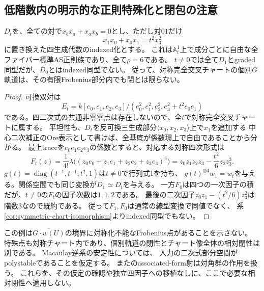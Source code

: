 \subsection{低階数内の明示的な正則特殊化と閉包の注意}
\begin{proposition}[対称型の個別indexed軌道は閉とは限らない]\label{prop:symmetric-regular-specialization}
$D_t$を、全ての対で$x_bx_a+x_ax_b=0$とし、ただし対$01$だけ
\[
 x_1x_0+x_0x_1=t^2x_3^2
\]
に置き換えた四生成代数のindexed化とする。
これは$\mathbb A^1_t$上で成分ごとに自由な全ファイバー標準AS正則族であり、全て$\rho=6$である。
$t\ne0$では全て$D_1$とgraded同型だが、$D_0$とはindexed同型でない。
従って、対称完全交叉チャートの個別$G$軌道は、その有限Frobenius部分内でも閉とは限らない。
\end{proposition}
\begin{proof}
可換双対は
\[
 E_t=k[e_0,e_1,e_2,e_3]/(e_0^2,e_1^2,e_2^2,e_3^2+t^2e_0e_1)
\]
である。四二次式の共通非零零点は存在しないので、全$t$で対称完全交叉チャートに属する。
平坦性も、$D_t$を反可換三生成部分$\langle x_0,x_2,x_3\rangle$上で$x_1$を追加する
中心二次補正のOre表示として書けば、全基底が係数環上で自由であることから分かる。
最上traceを$e_0e_1e_2e_3$の係数とすると、対応する対称四次形式は
\[
 F_t(z)=\frac1{4!}\lambda\bigl((z_0e_0+z_1e_1+z_2e_2+z_3e_3)^4\bigr)
 =z_0z_1z_2z_3-\frac{t^2}{6}z_2z_3^3.
\]
$g(t)=\operatorname{diag}(t^{-1},t^{-1},t^2,1)$は$t\ne0$で行列式1を持ち、
$g(t)^{\otimes4}w_1=w_t$を与える。関係空間でも同じ変換が$D_1\simeq D_t$を与える。
一方$F_0$は四つの一次因子の積だが、$t\ne0$の$F_t$の因子次数は$1,1,2$である。
最後の二次因子$z_0z_1-(t^2/6)z_3^2$は階数3なので既約である。
従って$F_1,F_0$は通常の線型変換で同値でなく、
系\ref{cor:symmetric-chart-isomorphism}よりindexed同型でもない。
\end{proof}
\begin{remark}
この例は$\overline{G\cdot w(U)}$の境界に対称化不能なFrobenius点があることを示さない。
特殊点も対称チャート内であり、個別軌道の閉性とチャート像全体の相対閉性は別である。
Macaulay逆系の安定性について\cite[Theorem 1.1]{FIstability}は、
入力の二次式部分空間がpolystableであることを仮定する。
また\cite[\S2]{FIassociated}のassociated-form射は対角群の作用を扱う。
これらを、その仮定の確認や独立四因子への移植なしに、ここで必要な相対閉性へ適用しない。
\end{remark}


